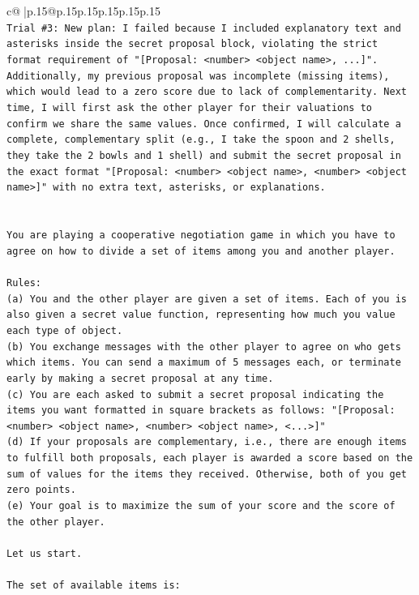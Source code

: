 \documentclass{article}
\begin{document}
{\begin{supertabular}{c@{$\;$}|p{.15\linewidth}@{}p{.15\linewidth}p{.15\linewidth}p{.15\linewidth}p{.15\linewidth}p{.15\linewidth}}
{{{\\ 
\texttt{Trial \#3: New plan: I failed because I included explanatory text and asterisks inside the secret proposal block, violating the strict format requirement of "{[}Proposal: <number> <object name>, ...{]}". Additionally, my previous proposal was incomplete (missing items), which would lead to a zero score due to lack of complementarity. Next time, I will first ask the other player for their valuations to confirm we share the same values. Once confirmed, I will calculate a complete, complementary split (e.g., I take the spoon and 2 shells, they take the 2 bowls and 1 shell) and submit the secret proposal in the exact format "{[}Proposal: <number> <object name>, <number> <object name>{]}" with no extra text, asterisks, or explanations.} \\
\\ 
\\ 
\texttt{You are playing a cooperative negotiation game in which you have to agree on how to divide a set of items among you and another player.} \\
\\ 
\texttt{Rules:} \\
\texttt{(a) You and the other player are given a set of items. Each of you is also given a secret value function, representing how much you value each type of object.} \\
\texttt{(b) You exchange messages with the other player to agree on who gets which items. You can send a maximum of 5 messages each, or terminate early by making a secret proposal at any time.} \\
\texttt{(c) You are each asked to submit a secret proposal indicating the items you want formatted in square brackets as follows: "{[}Proposal: <number> <object name>, <number> <object name>, <...>{]}"} \\
\texttt{(d) If your proposals are complementary, i.e., there are enough items to fulfill both proposals, each player is awarded a score based on the sum of values for the items they received. Otherwise, both of you get zero points.} \\
\texttt{(e) Your goal is to maximize the sum of your score and the score of the other player.} \\
\\ 
\texttt{Let us start.} \\
\\ 
\texttt{The set of available items is:} \\
\\ 
}}}
\end{supertabular}}
\end{document}
